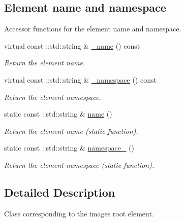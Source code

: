 \subsection*{Element name and namespace}
\label{_amgrpd4b5b61f6e07390f4af2465e04571f34}
Accessor functions for the element name and namespace. \begin{DoxyCompactItemize}
\item 
virtual const ::std::string \& \hyperlink{classopenstack_1_1xml_1_1Images___a4fc32f995f20c542ebb3831f7df915c4}{\_\-name} () const 
\begin{DoxyCompactList}\small\item\em Return the element name. \item\end{DoxyCompactList}\item 
virtual const ::std::string \& \hyperlink{classopenstack_1_1xml_1_1Images___a09ed7ad50d9f186cfcc090174991cd68}{\_\-namespace} () const 
\begin{DoxyCompactList}\small\item\em Return the element namespace. \item\end{DoxyCompactList}\item 
static const ::std::string \& \hyperlink{classopenstack_1_1xml_1_1Images___ab1a59d06638e4f849ebbb2a47d4caed8}{name} ()
\begin{DoxyCompactList}\small\item\em Return the element name (static function). \item\end{DoxyCompactList}\item 
static const ::std::string \& \hyperlink{classopenstack_1_1xml_1_1Images___a471332f191603abf9cfbb511f8087298}{namespace\_\-} ()
\begin{DoxyCompactList}\small\item\em Return the element namespace (static function). \item\end{DoxyCompactList}\end{DoxyCompactItemize}


\subsection{Detailed Description}
Class corresponding to the images root element. 

